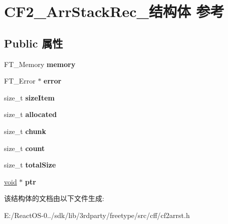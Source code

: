\hypertarget{struct_c_f2___arr_stack_rec__}{}\section{C\+F2\+\_\+\+Arr\+Stack\+Rec\+\_\+结构体 参考}
\label{struct_c_f2___arr_stack_rec__}
\subsection*{Public 属性}
\begin{DoxyCompactItemize}
\item 
\mbox{\label{struct_c_f2___arr_stack_rec___a8ec28de11a8a30bc59b914fa10cca17c}} 
F\+T\+\_\+\+Memory {\bfseries memory}
\item 
\mbox{\label{struct_c_f2___arr_stack_rec___abd5d7e6217d9d7dabadbcc86b0257b25}} 
F\+T\+\_\+\+Error $\ast$ {\bfseries error}
\item 
\mbox{\label{struct_c_f2___arr_stack_rec___a40f0768fa64c43497e974cf983139bf1}} 
size\+\_\+t {\bfseries size\+Item}
\item 
\mbox{\label{struct_c_f2___arr_stack_rec___a84bdd99ace4f6b07a1f552e822eb17f9}} 
size\+\_\+t {\bfseries allocated}
\item 
\mbox{\label{struct_c_f2___arr_stack_rec___a52fc3a68b5ad19b7fbfd628354b4e27d}} 
size\+\_\+t {\bfseries chunk}
\item 
\mbox{\label{struct_c_f2___arr_stack_rec___a7d11e24def70eb62913ec44e86fd2666}} 
size\+\_\+t {\bfseries count}
\item 
\mbox{\label{struct_c_f2___arr_stack_rec___a6b81219eb40d7890a29b922b3055d05d}} 
size\+\_\+t {\bfseries total\+Size}
\item 
\mbox{\label{struct_c_f2___arr_stack_rec___a5929bad275226a6247bb79a166fe1b7c}} 
\hyperlink{interfacevoid}{void} $\ast$ {\bfseries ptr}
\end{DoxyCompactItemize}


该结构体的文档由以下文件生成\+:\begin{DoxyCompactItemize}
\item 
E\+:/\+React\+O\+S-\/0../sdk/lib/3rdparty/freetype/src/cff/cf2arrst.\+h\end{DoxyCompactItemize}
